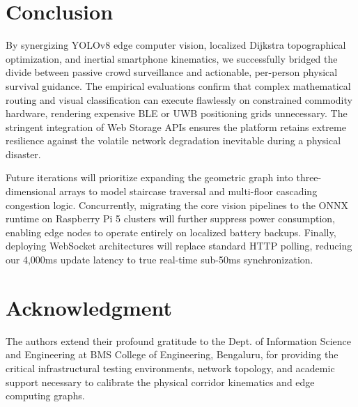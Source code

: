 \documentclass[conference]{IEEEtran}
\begin{document}
\section{Conclusion}
By synergizing YOLOv8 edge computer vision, localized Dijkstra topographical optimization, and
inertial smartphone kinematics, we successfully bridged the divide between passive crowd
surveillance and actionable, per-person physical survival guidance. The empirical evaluations
confirm that complex mathematical routing and visual classification can execute flawlessly on
constrained commodity hardware, rendering expensive BLE or UWB positioning grids unnecessary. The
stringent integration of Web Storage APIs ensures the platform retains extreme resilience against
the volatile network degradation inevitable during a physical disaster.

Future iterations will prioritize expanding the geometric graph into three-dimensional arrays to
model staircase traversal and multi-floor cascading congestion logic. Concurrently, migrating the
core vision pipelines to the ONNX runtime on Raspberry Pi 5 clusters will further suppress power
consumption, enabling edge nodes to operate entirely on localized battery backups. Finally,
deploying WebSocket architectures will replace standard HTTP polling, reducing our 4,000ms update
latency to true real-time sub-50ms synchronization.

\section*{Acknowledgment}
The authors extend their profound gratitude to the Dept. of Information Science and Engineering at
BMS College of Engineering, Bengaluru, for providing the critical infrastructural testing
environments, network topology, and academic support necessary to calibrate the physical corridor
kinematics and edge computing graphs.
\end{document}

